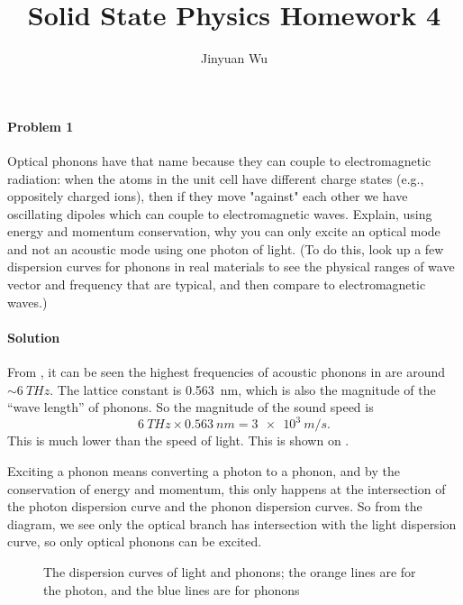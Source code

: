 \documentclass[hyperref, a4paper]{article}
\title{Solid State Physics Homework 4}
\author{Jinyuan Wu}
\begin{document}
\maketitle

\paragraph{Problem 1} Optical phonons have that name because they can couple to electromagnetic radiation: when the atoms in the unit cell have different charge states (e.g., oppositely charged ions), then if they move "against" each other we have oscillating dipoles which can couple to electromagnetic waves. Explain, using energy and momentum conservation, why you can only excite an optical mode and not an acoustic mode using one photon of light. (To do this, look up a few dispersion curves for phonons in real materials to see the physical ranges of wave vector and frequency that are typical, and then compare to electromagnetic waves.)

\paragraph{Solution} From \cite{messaoudi2015band},
it can be seen the highest frequencies of acoustic phonons in  are around $\sim \SI{6}{THz}$.
The lattice constant is \SI{0.563}{nm},
which is also the magnitude of the ``wave length'' of phonons.
So the magnitude of the sound speed is 
\[
    \SI{6}{THz} \times \SI{0.563}{nm} = \SI{3e3}{m/s}.
\]
This is much lower than the speed of light.
This is shown on .

Exciting a phonon means converting a photon to a phonon,
and by the conservation of energy and momentum,
this only happens at the intersection of the photon dispersion curve 
and the phonon dispersion curves.
So from the diagram, we see only the optical branch has intersection with the light dispersion curve,
so only optical phonons can be excited.

\begin{figure}
    \centering
    
    \caption{The dispersion curves of light and phonons; the orange lines are for the photon,
    and the blue lines are for phonons}
    \label{fig:light-and-optical-phonon}
\end{figure}
\end{document}
